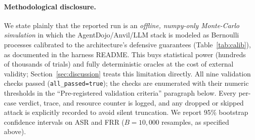 \documentclass[10pt,twocolumn,letterpaper]{article}
\begin{document}
\paragraph{Methodological disclosure.} We state plainly that the reported run is an \emph{offline, numpy-only Monte-Carlo simulation} in which the AgentDojo/Anvil/LLM stack is modeled as Bernoulli processes calibrated to the architecture's defensive guarantees (Table~\ref{tab:calib}), as documented in the harness README. This buys statistical power (hundreds of thousands of trials) and fully deterministic oracles at the cost of external validity; Section~\ref{sec:discussion} treats this limitation directly. All nine validation checks passed (\texttt{all\_passed=true}); the checks are enumerated with their numeric thresholds in the ``Pre-registered validation criteria'' paragraph below. Every per-case verdict, trace, and resource counter is logged, and any dropped or skipped attack is explicitly recorded to avoid silent truncation. We report 95\% bootstrap confidence intervals on ASR and FRR ($B=10{,}000$ resamples, as specified above).
\end{document}
